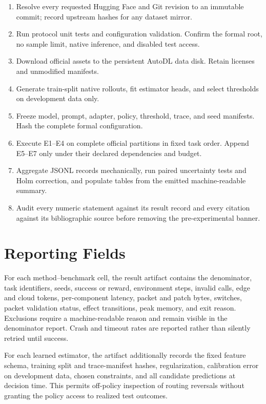 \documentclass[10pt]{article}
\begin{document}
\begin{enumerate}
  \item Resolve every requested Hugging Face and Git revision to an immutable
  commit; record upstream hashes for any dataset mirror.
  \item Run protocol unit tests and configuration validation. Confirm the
  formal root, no sample limit, native inference, and disabled test access.
  \item Download official assets to the persistent AutoDL data disk. Retain
  licenses and unmodified manifests.
  \item Generate train-split native rollouts, fit estimator heads, and select
  thresholds on development data only.
  \item Freeze model, prompt, adapter, policy, threshold, trace, and seed
  manifests. Hash the complete formal configuration.
  \item Execute E1--E4 on complete official partitions in fixed task order.
  Append E5--E7 only under their declared dependencies and budget.
  \item Aggregate JSONL records mechanically, run paired uncertainty tests and
  Holm correction, and populate tables from the emitted machine-readable
  summary.
  \item Audit every numeric statement against its result record and every
  citation against its bibliographic source before removing the
  pre-experimental banner.
\end{enumerate}

\section{Reporting Fields}
\label{app:reporting}

For each method--benchmark cell, the result artifact contains the denominator,
task identifiers, seeds, success or reward, environment steps, invalid calls,
edge and cloud tokens, per-component latency, packet and patch bytes, switches,
packet validation status, effect transitions, peak memory, and exit reason.
Exclusions require a machine-readable reason and remain visible in the
denominator report. Crash and timeout rates are reported rather than silently
retried until success.

For each learned estimator, the artifact additionally records the fixed
feature schema, training split and trace-manifest hashes, regularization,
calibration error on development data, chosen constraints, and all candidate
predictions at decision time. This permits off-policy inspection of routing
reversals without granting the policy access to realized test outcomes.



\end{document}
